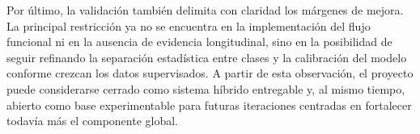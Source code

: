 Por último, la validación también delimita con claridad los márgenes de mejora.
La principal restricción ya no se encuentra en la implementación del flujo
funcional ni en la ausencia de evidencia longitudinal, sino en la posibilidad de
seguir refinando la separación estadística entre clases y la calibración del
modelo conforme crezcan los datos supervisados. A partir de esta observación,
el proyecto puede considerarse cerrado como sistema híbrido entregable y, al
mismo tiempo, abierto como base experimentable para futuras iteraciones
centradas en fortalecer todavía más el componente global.
